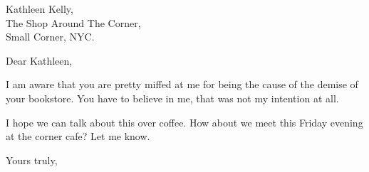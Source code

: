 \documentclass[a4paper, 10pt]{letter}
\begin{document}
\begin{letter}
{
    Kathleen Kelly,\\
    The Shop Around The Corner,\\
    Small Corner, NYC.
}

\opening{Dear Kathleen,}


I am aware that you are pretty miffed at me for being the cause of the demise of your bookstore. You have to believe in me, that was not my intention at all.

I hope we can talk about this over coffee. How about we meet this Friday evening at the corner cafe? Let me know.

\closing{Yours truly,}

\end{letter}
\end{document}
